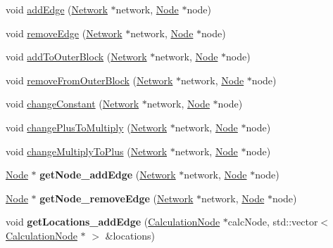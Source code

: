 \begin{DoxyCompactItemize}
\item 
void \hyperlink{classNetworkModifier_a7486df4a68343d65eb5bfb766d6959dd}{add\+Edge} (\hyperlink{classNetwork}{Network} $\ast$network, \hyperlink{classNode}{Node} $\ast$node)
\item 
void \hyperlink{classNetworkModifier_a98de1cc69f96a312d823a18fb4e32125}{remove\+Edge} (\hyperlink{classNetwork}{Network} $\ast$network, \hyperlink{classNode}{Node} $\ast$node)
\item 
void \hyperlink{classNetworkModifier_aa3003a2ca2ba2a64e3dfa52372befafe}{add\+To\+Outer\+Block} (\hyperlink{classNetwork}{Network} $\ast$network, \hyperlink{classNode}{Node} $\ast$node)
\item 
void \hyperlink{classNetworkModifier_aa61381ec53af37a67753b95e162e2ee6}{remove\+From\+Outer\+Block} (\hyperlink{classNetwork}{Network} $\ast$network, \hyperlink{classNode}{Node} $\ast$node)
\item 
void \hyperlink{classNetworkModifier_a574c45de40cd717c66412a821dec7720}{change\+Constant} (\hyperlink{classNetwork}{Network} $\ast$network, \hyperlink{classNode}{Node} $\ast$node)
\item 
void \hyperlink{classNetworkModifier_af847b438d989b02336200e47f2059be5}{change\+Plus\+To\+Multiply} (\hyperlink{classNetwork}{Network} $\ast$network, \hyperlink{classNode}{Node} $\ast$node)
\item 
void \hyperlink{classNetworkModifier_a50d862b93e5f37acaa073e5edaad9a2c}{change\+Multiply\+To\+Plus} (\hyperlink{classNetwork}{Network} $\ast$network, \hyperlink{classNode}{Node} $\ast$node)
\item 
\hyperlink{classNode}{Node} $\ast$ {\bfseries get\+Node\+\_\+add\+Edge} (\hyperlink{classNetwork}{Network} $\ast$network, \hyperlink{classNode}{Node} $\ast$node)\hypertarget{classNetworkModifier_a3ca48b0cbcc665ffadd0cebcc3a3e45b}{}\label{classNetworkModifier_a3ca48b0cbcc665ffadd0cebcc3a3e45b}

\item 
\hyperlink{classNode}{Node} $\ast$ {\bfseries get\+Node\+\_\+remove\+Edge} (\hyperlink{classNetwork}{Network} $\ast$network, \hyperlink{classNode}{Node} $\ast$node)\hypertarget{classNetworkModifier_a1519488c4c8787563bd37b8591f741bf}{}\label{classNetworkModifier_a1519488c4c8787563bd37b8591f741bf}

\item 
void {\bfseries get\+Locations\+\_\+add\+Edge} (\hyperlink{classCalculationNode}{Calculation\+Node} $\ast$calc\+Node, std\+::vector$<$ \hyperlink{classCalculationNode}{Calculation\+Node} $\ast$ $>$ \&locations)\hypertarget{classNetworkModifier_ac2e65c2e6985a1b6b8d90e0d5eac7b36}{}\label{classNetworkModifier_ac2e65c2e6985a1b6b8d90e0d5eac7b36}


\end{DoxyCompactItemize}
